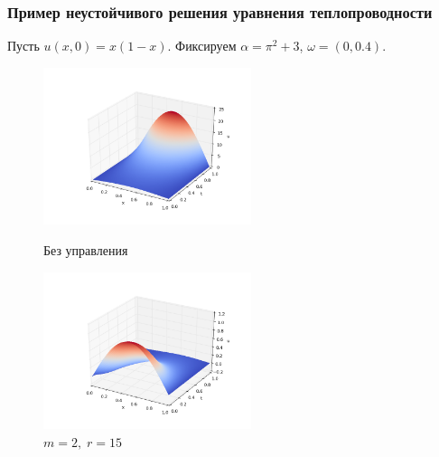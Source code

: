 \documentclass{beamer}
\begin{document}
\begin{frame}
    \frametitle{Пример неустойчивого решения уравнения теплопроводности}

    Пусть $u(x, 0) = x(1 - x)$. Фиксируем $\alpha = \pi^2 + 3$, $\omega = (0, 0.4)$.


    \begin{figure}[H]
        \centering
        \begin{minipage}{.5\textwidth}
            \centering
            \includegraphics[width=2.4in]{par_ex_pi3}
            \caption{Без управления}
            \label{fig:test3}
        \end{minipage}%
        \begin{minipage}{.5\textwidth}
            \centering
            \includegraphics[width=2.4in]{par_re_pi3}
            \caption{$m = 2,\; r = 15$}
            \label{fig:test4}
        \end{minipage}
    \end{figure}

\end{frame}
\end{document}
